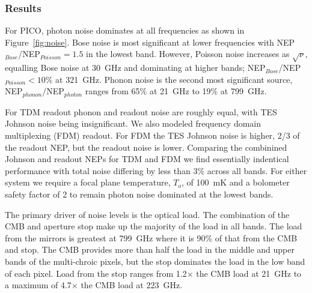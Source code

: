 \documentclass[]{spie}  %
\begin{document}
\subsubsection{Results}  %

For PICO, photon noise dominates at all frequencies as shown in Figure~\ref{fig:noise}. Bose noise is most significant 
at lower frequencies with NEP$_{Bose}$/NEP$_{Poisson}= 1.5 $ in the lowest band.  However, Poisson noise increases as 
$\sqrt{\nu}$, equalling Bose noise at 30~GHz and dominating at higher bands; NEP$_{Bose}$/NEP$_{Poisson} <10\%$ at 321~GHz. 
Phonon noise is the second most significant source, NEP$_{phonon}$/NEP$_{photon}$ ranges from 65\% at 21~GHz 
to 19\% at 799~GHz. 

For TDM readout phonon and readout noise are roughly equal, with TES Johnson noise being insignificant.  We also modeled 
frequency domain multiplexing (FDM) readout.  For FDM the TES Johnson noise is higher, 2/3 of the readout NEP, but the readout 
noise is lower.  Comparing the combinined Johnson and readout NEPs for TDM and FDM we find essentially indentical performance 
with total noise differing by less than 3\% across all bands.  For either system we require a focal plane temperature, $T_o$, of 
100~mK and a bolometer safety factor of 2 to remain photon noise dominated at the lowest bands.

The primary driver of noise levels is the optical load.  The combination of the CMB and aperture stop make up the majority of the load in all bands.
The load from the mirrors is greatest at 799~GHz where it is 90\% of that from the CMB and stop. The CMB provides more than half the load 
in the middle and upper bands of the multi-chroic pixels, but the stop dominates the load in the low band of each pixel.  Load from the 
stop ranges from 1.2$\times$ the CMB load at 21~GHz to a maximum of 4.7$\times$ the CMB load at 223~GHz. 


\end{document}
